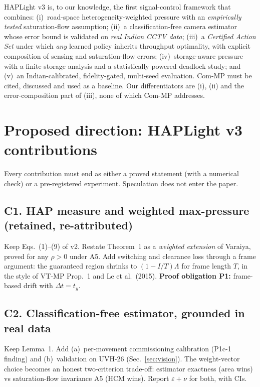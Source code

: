 \documentclass[11pt,a4paper]{article}
\begin{document}
\begin{keybox}
HAPLight v3 is, to our knowledge, the first signal-control framework that combines:
(i)~road-space heterogeneity-weighted pressure with an \emph{empirically tested}
saturation-flow assumption;
(ii)~a classification-free camera estimator whose error bound is validated on
\emph{real Indian CCTV data};
(iii)~a \emph{Certified Action Set} under which \emph{any} learned policy inherits
throughput optimality, with explicit composition of sensing and saturation-flow errors;
(iv)~storage-aware pressure with a finite-storage analysis and a statistically powered
deadlock study; and
(v)~an Indian-calibrated, fidelity-gated, multi-seed evaluation.
Com-MP must be cited, discussed and used as a baseline. Our differentiators are (i), (ii)
and the error-composition part of (iii), none of which Com-MP addresses.
\end{keybox}

\section{Proposed direction: HAPLight v3 contributions}
\label{sec:contrib}
Every contribution must end as either a proved statement (with a numerical check) or a
pre-registered experiment. Speculation does not enter the paper.

\subsection*{C1. HAP measure and weighted max-pressure (retained, re-attributed)}
Keep Eqs.~(1)--(9) of v2. Restate Theorem~1 as a \emph{weighted extension} of Varaiya,
proved for any $\rho>0$ under A5. Add switching and clearance loss through a frame
argument: the guaranteed region shrinks to $(1-I/T)\Lambda$ for frame length $T$, in the
style of VT-MP Prop.~1 and Le et al.\ (2015).
\textbf{Proof obligation P1:} frame-based drift with $\Delta t=t_y$.

\subsection*{C2. Classification-free estimator, grounded in real data}
Keep Lemma~1. Add (a)~per-movement commissioning calibration (P1c-1 finding) and
(b)~validation on UVH-26 (Sec.~\ref{sec:vision}). The weight-vector choice becomes an
honest two-criterion trade-off: estimator exactness (area wins) vs saturation-flow
invariance A5 (HCM wins). Report $\varepsilon+\nu$ for both, with CIs.
\end{document}
